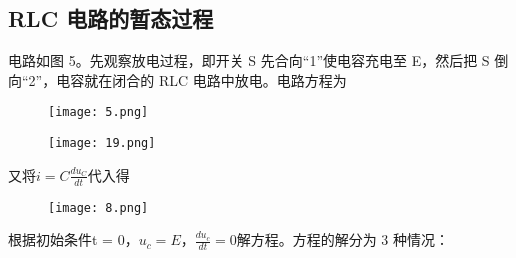 \documentclass[11pt,a4paper]{article}
\begin{document}
\subsection{ RLC 电路的暂态过程}
电路如图 5。先观察放电过程，即开关 S 先合向“1”使电容充电至 E，然后把 S 倒向“2”，电容就在闭合的
RLC 电路中放电。电路方程为
\begin{figure}[H]
    \centering
    \texttt{[image: 5.png]}
\end{figure}
\begin{figure}[H]
    \centering
    \texttt{[image: 19.png]}
\end{figure}
又将$ i = C\frac{d{u_C}}{dt}$代入得
\begin{figure}[H]
    \centering
    \texttt{[image: 8.png]}
\end{figure}
根据初始条件t = 0，$u_c = E$，$\frac{d{u_c}}{dt}=0$解方程。方程的解分为 3 种情况：
\end{document}
